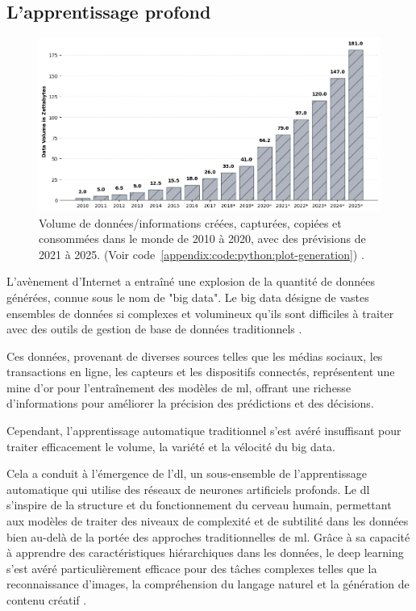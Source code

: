 \subsection{L'apprentissage profond}

\begin{figure}[H]
    \centering
    \includegraphics[width=15cm]{gfx/fig-big-data.png}
    \caption{Volume de données/informations créées, capturées, copiées et consommées dans le monde de 2010 à 2020, avec des prévisions de 2021 à 2025. (Voir code~\ref{appendix:code:python:plot-generation}) \cite{datagenerate2010}.}
    \label{fig:datagenerated}
\end{figure}

L'avènement d'Internet a entraîné une explosion de la quantité de données générées, connue sous le nom de "big data". Le big data désigne de vastes ensembles de données si complexes et volumineux qu'ils sont difficiles à traiter avec des outils de gestion de base de données traditionnels \cite{Ratner_2012}.

Ces données, provenant de diverses sources telles que les médias sociaux, les transactions en ligne, les capteurs et les dispositifs connectés, représentent une mine d'or pour l'entraînement des modèles de \ac{ml}, offrant une richesse d'informations pour améliorer la précision des prédictions et des décisions.

Cependant, l'apprentissage automatique traditionnel s'est avéré insuffisant pour traiter efficacement le volume, la variété et la vélocité du big data. 

Cela a conduit à l'émergence de l'\acf{dl}, un sous-ensemble de l'apprentissage automatique qui utilise des réseaux de neurones artificiels profonds. Le \ac{dl} s'inspire de la structure et du fonctionnement du cerveau humain, permettant aux modèles de traiter des niveaux de complexité et de subtilité dans les données bien au-delà de la portée des approches traditionnelles de \ac{ml}. Grâce à sa capacité à apprendre des caractéristiques hiérarchiques dans les données, le deep learning s'est avéré particulièrement efficace pour des tâches complexes telles que la reconnaissance d'images, la compréhension du langage naturel et la génération de contenu créatif \cite{Foster_2019}.

